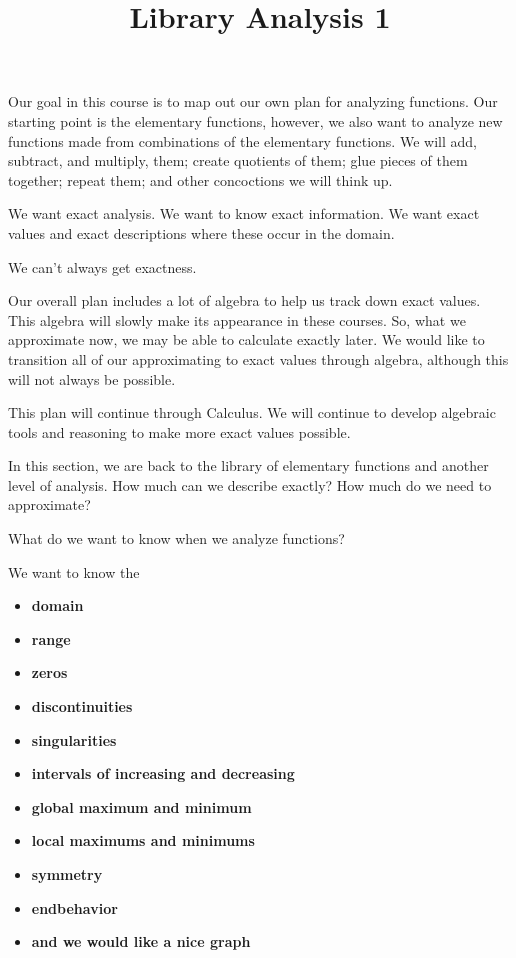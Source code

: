 \documentclass{ximera}
\title{Library Analysis 1}
\begin{document}
\begin{abstract}
\end{abstract}
\maketitle


Our goal in this course is to map out our own plan for analyzing functions.  Our starting point is the elementary functions, however, we also want to analyze new functions made from combinations of the elementary functions.  We will add, subtract, and multiply, them; create quotients of them; glue pieces of them together; repeat them; and other concoctions we will think up.

We want exact analysis.  We want to know exact information.  We want exact values and exact descriptions where these occur in the domain.

We can't always get exactness. 

Our overall plan includes a lot of algebra to help us track down exact values.  This algebra will slowly make its appearance in these courses.  So, what we approximate now, we may be able to calculate exactly later.  We would like to transition all of our approximating to exact values through algebra, although this will not always be possible.

This plan will continue through Calculus.  We will continue to develop algebraic tools and reasoning to make more exact values possible.

In this section, we are back to the library of elementary functions and another level of analysis.  How much can we describe exactly? How much do we need to approximate?


What do we want to know when we analyze functions?

We want to know the 
\begin{itemize}
\item \textbf{\textcolor{red!80!black}{domain}} 
\item \textbf{\textcolor{red!80!black}{range}} 
\item \textbf{\textcolor{red!80!black}{zeros}} 
\item \textbf{\textcolor{red!80!black}{discontinuities}} 
\item \textbf{\textcolor{red!80!black}{singularities}} 
\item \textbf{\textcolor{red!80!black}{intervals of increasing and decreasing}} 
\item \textbf{\textcolor{red!80!black}{global maximum and minimum}} 
\item \textbf{\textcolor{red!80!black}{local maximums and minimums}} 
\item \textbf{\textcolor{red!80!black}{symmetry}} 
\item \textbf{\textcolor{red!80!black}{endbehavior}}  \\
\item \textbf{\textcolor{purple!85!blue}{and we would like a nice graph}} 
\end{itemize}
\end{document}
